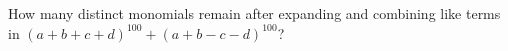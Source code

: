 How many distinct monomials remain after expanding and combining like terms in $(a+b+c+d)^{100}+(a+b-c-d)^{100}$?
